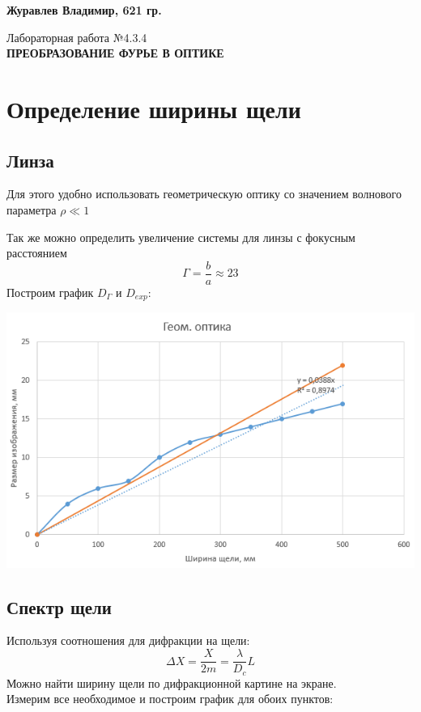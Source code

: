 \documentclass[12pt,a4paper]{article}
\author{Владимир Журавлев}
\begin{document}
\begin{flushright}

\textbf{Журавлев Владимир, 621 гр.\\}


\end{flushright}
\begin{center}
\begin{LARGE}

\vspace{\baselineskip}
Лабораторная работа №4.3.4\\
\textbf{
ПРЕОБРАЗОВАНИЕ ФУРЬЕ В ОПТИКЕ}\\
\vspace{\baselineskip}

\end{LARGE}
\end{center}


\section{Определение ширины щели}
\subsection{Линза}
Для этого удобно использовать геометрическую оптику со значением волнового параметра $  \rho \ll 1$

Так же можно определить увеличение системы для линзы с фокусным расстоянием 
\[\Gamma = \frac{b}{a} \approx 23 \]
Построим график $D_\Gamma$ и $D_{exp}$:
\begin{center}
\includegraphics[scale=1]{434_g1.png}
\end{center}
\subsection{Спектр щели}
Используя соотношения для дифракции на щели:
\[\Delta X = \frac{X}{2m} = \frac{\lambda}{D_c} L\]
Можно найти ширину щели по дифракционной картине на экране.\\
Измерим все необходимое и построим график для обоих пунктов:
\end{document}
